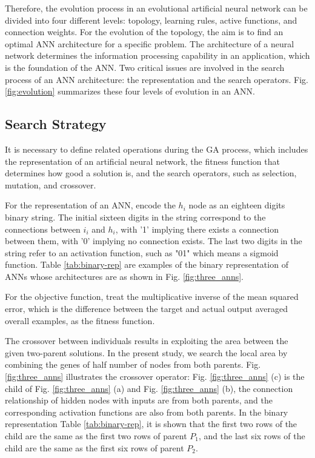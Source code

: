 \documentclass[letterpaper]{IEEEtran}
\begin{document}
Therefore, the evolution process in an evolutional artificial neural network can
be divided into four different levels: topology, learning rules, active
functions, and connection weights. For the evolution of the topology, the aim is
to find an optimal ANN architecture for a specific problem. The architecture of
a neural network determines the information processing capability in an
application, which is the foundation of the ANN. Two critical issues are
involved in the search process of an ANN architecture: the representation and
the search operators. Fig. \ref{fig:evolution} summarizes these four levels of
evolution in an ANN.

\subsection{Search Strategy}

It is necessary to define related operations during the GA process, which
includes the representation of an artificial neural network, the fitness
function that determines how good a solution is, and the search operators, such
as selection, mutation, and crossover.

For the representation of an ANN, encode the $h_i$ node as an eighteen digits
binary string. The initial sixteen digits in the string correspond to the
connections between $i_i$ and $h_i$, with '1' implying there exists a connection
between them, with '0' implying no connection exists. The last two digits in the
string refer to an activation function, such as "01" which means a sigmoid
function. Table \ref{tab:binary-rep} are examples of the binary representation
of ANNs whose architectures are as shown in Fig. \ref{fig:three_anns}. 

For the objective function, treat the multiplicative inverse of the mean squared
error, which is the difference between the target and actual output averaged
overall examples, as the fitness function.

The crossover between individuals results in exploiting the area between the
given two-parent solutions. In the present study, we search the local area by
combining the genes of half number of nodes from both parents.  Fig.
\ref{fig:three_anns} illustrates the crossover operator: Fig.
\ref{fig:three_anns} (c) is the child of Fig. \ref{fig:three_anns} (a) and Fig.
\ref{fig:three_anns} (b), the connection relationship of hidden nodes with
inputs are from both parents,  and the corresponding activation functions are
also from both parents. In the binary representation Table \ref{tab:binary-rep},
it is shown that the first two rows of the child are the same as the first two
rows of parent $P_1$, and the last six rows of the child are the same as the
first six rows of parent $P_2$.
\end{document}
